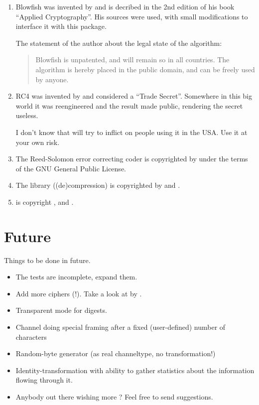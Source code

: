 \documentclass {report}
\begin{document}
\begin {enumerate}
\item	Blowfish was invented by \schneier{} and is decribed in the
	2nd edition of his book ``Applied Cryptography''. His sources
	were used, with small modifications to interface it with this
	package.

	The statement of the author about the legal state of the
	algorithm:

	\begin {quotation}
		Blowfish is unpatented, and will remain so in all
		countries. The algorithm is hereby placed in the
		public domain, and can be freely used by anyone.
	\end {quotation}

\item	RC4 was invented by \rsadsi{} and considered a ``Trade
	Secret''. Somewhere in this big world it was reengineered and
	the result made public, rendering the secret useless.

	I don't know that \rsadsi will try to inflict on people using
	it in the USA. Use it at your own risk.

\item	The Reed-Solomon error correcting coder is copyrighted by
	\paulf{} under the terms of the GNU General Public License.

\item	The library \zlib{} ((de)compression) is copyrighted by
	\jlgailly{} and \madler.

\item	\rmd{} is copyright \dobbertin{}, \bosselaers{} and \preneel{}.
\end   {enumerate}


\chapter {Future}

Things to be done in future.

\begin {itemize}
\item	The tests are incomplete, expand them.
\item	Add more ciphers (\PGP!). Take a look at \pgplib{} by \tage{}.
\item	Transparent mode for digests.
\item	Channel doing special framing after a fixed (user-defined)
	number of characters
\item	Random-byte generator (as real channeltype, no transformation!)
\item	Identity-transformation with ability to gather statistics
	about the information flowing through it.
\item	Anybody out there wishing more ? Feel free to send \me{}
	suggestions.
\end   {itemize}


\printindex
\end{document}
